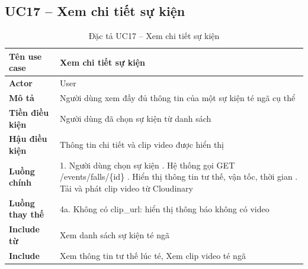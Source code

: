 \subsection*{UC17 -- Xem chi tiết sự kiện}
\begin{table}[H]
    \captionsetup{justification=raggedright, singlelinecheck=false}
    \caption{Đặc tả UC17 -- Xem chi tiết sự kiện}
\centering
\begin{tabular}{|p{3.5cm}|p{10cm}|}
\hline
\textbf{Tên use case} & Xem chi tiết sự kiện \\
\hline
\textbf{Actor} & User \\
\hline
\textbf{Mô tả} & Người dùng xem đầy đủ thông tin của một
  sự kiện té ngã cụ thể \\
\hline
\textbf{Tiền điều kiện} & Người dùng đã chọn sự kiện từ
  danh sách \\
\hline
\textbf{Hậu điều kiện} & Thông tin chi tiết và clip video
  được hiển thị \\
\hline
\textbf{Luồng chính} &
  1. Người dùng chọn sự kiện \newline
  2. Hệ thống gọi GET /events/falls/\{id\} \newline
  3. Hiển thị thông tin tư thế, vận tốc, thời gian \newline
  4. Tải và phát clip video từ Cloudinary \\
\hline
\textbf{Luồng thay thế} &
  4a. Không có clip\_url: hiển thị thông báo
  không có video \\
\hline
\textbf{Include từ} & Xem danh sách sự kiện té ngã \\
\hline
\textbf{Include} & Xem thông tin tư thế lúc té,
  Xem clip video té ngã \\
\hline
\end{tabular}

\end{table}

